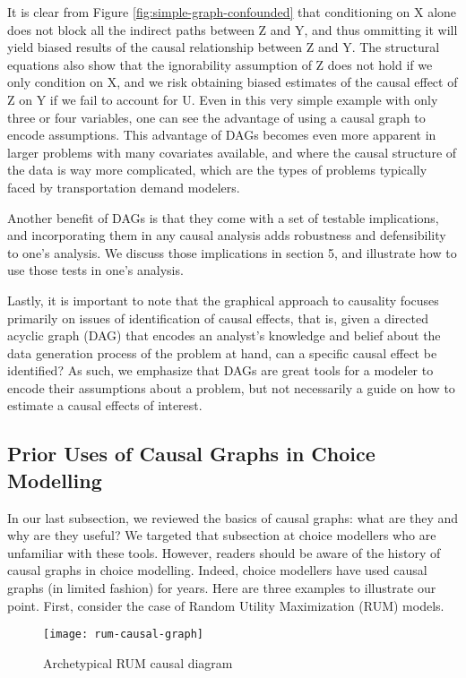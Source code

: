 It is clear from Figure \ref{fig:simple-graph-confounded} that conditioning on X alone does not block all the indirect paths between Z and Y, and thus ommitting it will yield biased results of the causal relationship between Z and Y.
The structural equations also show that the ignorability assumption
of Z does not hold if we only condition on X, and we risk obtaining biased estimates of the causal effect of Z on Y if we fail to
account for U.
Even in this very simple example with only three or four variables, one can see the advantage of using a causal graph to encode assumptions.
This advantage of DAGs becomes even more apparent in larger problems with many covariates available, and where the causal structure of the data is way more complicated, which are the types of problems typically faced by transportation demand modelers.

Another benefit of DAGs is that they come with a set of testable implications, and incorporating them in any causal
analysis adds robustness and defensibility to one's analysis.
We discuss those implications in section 5, and illustrate how to use those tests in one's analysis.

Lastly, it is important to note that the graphical approach to causality focuses
primarily on issues of identification of causal effects, that is, given a
directed acyclic graph (DAG) that encodes an analyst's knowledge and belief
about the data generation process of the problem at hand, can a specific
causal effect be identified?
As such, we emphasize that DAGs are great tools
for a modeler to encode their assumptions about a problem, but not necessarily
a guide on how to estimate a causal effects of interest.

\subsection{Prior Uses of Causal Graphs in Choice Modelling}
\label{sec:choice-graphs}

In our last subsection, we reviewed the basics of causal graphs: what are they and why are they useful?
We targeted that subsection at choice modellers who are unfamiliar with these tools.
However, readers should be aware of the history of causal graphs in choice modelling.
Indeed, choice modellers have used causal graphs (in limited fashion) for years.
Here are three examples to illustrate our point.
First, consider the case of Random Utility Maximization (RUM) models.

\begin{figure}
   \centering
   \texttt{[image: rum-causal-graph]}
   \caption{Archetypical RUM causal diagram}
   \label{fig:example-graph-rum}
\end{figure}


